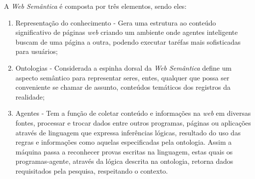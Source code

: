 A \textit{Web Semântica} é composta por três elementos, sendo eles:
\begin{enumerate}
\item Representação do conhecimento - Gera uma estrutura ao conteúdo significativo de páginas \textit{web} criando um ambiente onde agentes inteligente buscam de uma página a outra, podendo executar taréfas mais sofisticadas para usuários;
\item Ontologias -  Considerada a espinha dorsal da \textit{Web Semântica} define um aspecto semântico para representar seres, entes, qualquer que possa ser conveniente se chamar de assunto, conteúdos temáticos dos registros da realidade;
\item Agentes - Tem a função de coletar conteúdo e informações na \textit{web} em diversas fontes, processar e trocar dados entre outros programas, páginas ou aplicações através de linguagem que expressa inferências lógicas, resultado do uso das regras e informações como aquelas especificadas pela ontologia. Assim a máquina passa a reconhecer provas escritas na linguagem, estas quais os programas-agente, através da lógica descrita na ontologia, retorna dados requisitados pela pesquisa, respeitando o contexto.
\end{enumerate}

